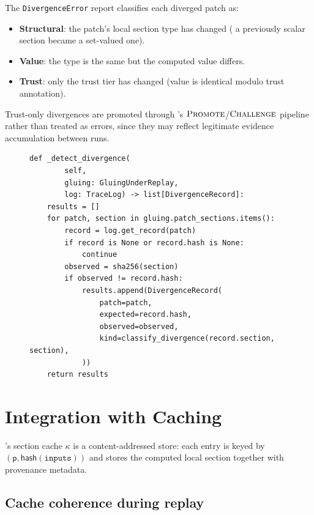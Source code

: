\documentclass[11pt]{article}
\newcommand{\Patch}{\mathsf{p}}
\newcommand{\CacheFn}{\kappa}
\newcommand{\HashFn}{\mathsf{hash}}
\begin{document}
The \texttt{DivergenceError} report classifies each diverged patch as:
\begin{itemize}
\item \textbf{Structural}: the patch's local section type has changed
  (\eg{} a previously scalar section became a set-valued one).
\item \textbf{Value}: the type is the same but the computed value
  differs.
\item \textbf{Trust}: only the trust tier has changed (value is
  identical modulo trust annotation).
\end{itemize}

Trust-only divergences are promoted through \JuGeo's
$\textsc{Promote}$/$\textsc{Challenge}$ pipeline rather than treated as errors,
since they may reflect legitimate evidence accumulation between runs.

\begin{figure}[htbp]
\begin{lstlisting}[style=jugeo-python, caption={Divergence detection
  and classification.}]
def _detect_divergence(
        self,
        gluing: GluingUnderReplay,
        log: TraceLog) -> list[DivergenceRecord]:
    results = []
    for patch, section in gluing.patch_sections.items():
        record = log.get_record(patch)
        if record is None or record.hash is None:
            continue
        observed = sha256(section)
        if observed != record.hash:
            results.append(DivergenceRecord(
                patch=patch,
                expected=record.hash,
                observed=observed,
                kind=classify_divergence(record.section, section),
            ))
    return results
\end{lstlisting}
\end{figure}


\section{Integration with Caching}
\label{sec:cache}

\JuGeo's section cache $\CacheFn$ is a content-addressed store: each
entry is keyed by $(\Patch, \HashFn(\mathtt{inputs}))$ and stores the
computed local section together with provenance metadata.

\subsection{Cache coherence during replay}
\end{document}
